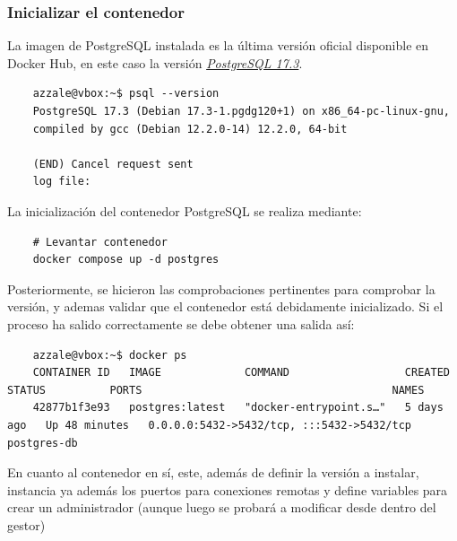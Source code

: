 \documentclass{article}
\begin{document}
\subsubsection{Inicializar el contenedor}
La imagen de PostgreSQL instalada es la última versión oficial disponible en Docker Hub, en este caso la versión
\textit{\textcolor{blue}{\href{https://www.postgresql.org/ftp/source/v17.3/}{PostgreSQL 17.3}}}.

\begin{tcolorbox}[colback=black, coltext=white, fontupper=\ttfamily, title=Terminal]
\begin{verbatim}
    azzale@vbox:~$ psql --version
    PostgreSQL 17.3 (Debian 17.3-1.pgdg120+1) on x86_64-pc-linux-gnu, 
    compiled by gcc (Debian 12.2.0-14) 12.2.0, 64-bit

    (END) Cancel request sent
    log file:
\end{verbatim}
\end{tcolorbox}

La inicialización del contenedor PostgreSQL se realiza mediante:
\begin{lstlisting}
    # Levantar contenedor
    docker compose up -d postgres
\end{lstlisting}
Posteriormente, se hicieron las comprobaciones pertinentes para comprobar la versión, y ademas validar que el contenedor está debidamente inicializado. Si el proceso ha salido correctamente se debe obtener una salida así:

\begin{tcolorbox}[colback=black, coltext=white, fontupper=\ttfamily, title=Terminal]
\begin{verbatim}
    azzale@vbox:~$ docker ps
    CONTAINER ID   IMAGE             COMMAND                  CREATED      STATUS          PORTS                                       NAMES
    42877b1f3e93   postgres:latest   "docker-entrypoint.s…"   5 days ago   Up 48 minutes   0.0.0.0:5432->5432/tcp, :::5432->5432/tcp   postgres-db
\end{verbatim}
\end{tcolorbox}

En cuanto al contenedor en sí, este, además de definir la versión a instalar, instancia ya además los puertos para conexiones remotas y define variables para crear un administrador (aunque luego se probará a modificar desde dentro del gestor)
\end{document}

